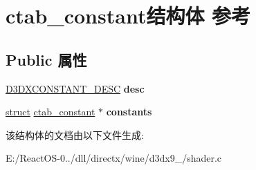 \hypertarget{structctab__constant}{}\section{ctab\+\_\+constant结构体 参考}
\label{structctab__constant}
\subsection*{Public 属性}
\begin{DoxyCompactItemize}
\item 
\mbox{\label{structctab__constant_ad1e13837496d4e4147a724122d649f43}} 
\hyperlink{struct___d3_d_x_c_o_n_s_t_a_n_t___d_e_s_c}{D3\+D\+X\+C\+O\+N\+S\+T\+A\+N\+T\+\_\+\+D\+E\+SC} {\bfseries desc}
\item 
\mbox{\label{structctab__constant_aaad041c084ab5deda8c37a688ebe2846}} 
\hyperlink{interfacestruct}{struct} \hyperlink{structctab__constant}{ctab\+\_\+constant} $\ast$ {\bfseries constants}
\end{DoxyCompactItemize}


该结构体的文档由以下文件生成\+:\begin{DoxyCompactItemize}
\item 
E\+:/\+React\+O\+S-\/0../dll/directx/wine/d3dx9\+\_/shader.\+c\end{DoxyCompactItemize}
